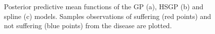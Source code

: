 \documentclass[onecolumn,a4paper,11pt]{article}
\begin{document}
\begin{figure}
\caption{Posterior predictive mean functions of the GP (a), HSGP (b) and spline (c) models. Samples observations of suffering (red points) and not suffering (blue points) from the disease are plotted.}
  \label{ch5_fig18_gpfun_diabetes}
\end{figure}
\end{document}
